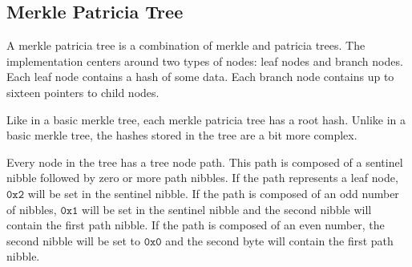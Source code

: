 \begin{figure}[H]
\end{figure}

\subsection{Merkle Patricia Tree}

A merkle patricia tree is a combination of merkle and patricia trees.
The \codenamespace implementation centers around two types of nodes: leaf nodes and branch nodes.
Each leaf node contains a hash of some data.
Each branch node contains up to sixteen pointers to child nodes.

Like in a basic merkle tree, each merkle patricia tree has a root hash.
Unlike in a basic merkle tree, the hashes stored in the tree are a bit more complex.

Every node in the tree has a tree node path.
This path is composed of a sentinel nibble followed by zero or more path nibbles.
If the path represents a leaf node, $\texttt{0x2}$ will be set in the sentinel nibble.
If the path is composed of an odd number of nibbles, $\texttt{0x1}$ will be set in the sentinel nibble and the second nibble will contain the first path nibble.
If the path is composed of an even number, the second nibble will be set to $\texttt{0x0}$ and the second byte will contain the first path nibble.

